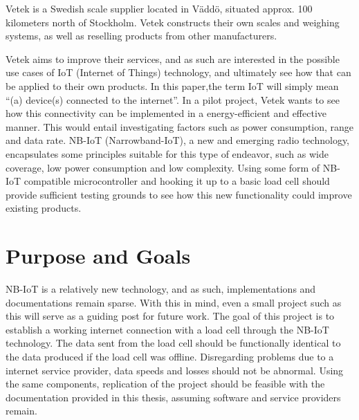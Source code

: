 Vetek is a Swedish scale supplier located in Väddö, situated approx. 100 kilometers north of Stockholm. Vetek constructs their own scales and weighing systems, as well as reselling products from other manufacturers.\cite{vetek} 

Vetek aims to improve their services, and as such are interested in the possible use cases of IoT (Internet of Things) technology, and ultimately see how that can be applied to their own products. In this paper,the term IoT will simply mean ``(a) device(s) connected to the internet''\cite{what_is_iot}. In a pilot project, Vetek wants to see how this connectivity can be implemented in a energy-efficient and effective manner. This would entail investigating factors such as power consumption, range and data rate. NB-IoT (Narrowband-IoT), a new and emerging radio technology, encapsulates some principles suitable for this type of endeavor, such as wide coverage, low power consumption and low complexity.\cite{NB-overview} Using some form of NB-IoT compatible microcontroller and hooking it up to a basic load cell should provide sufficient testing grounds to see how this new functionality could improve existing products.


\section{Purpose and Goals}
\iffalse
\begin{itemize}
	\item Write about the grand scheme of things
	\item Set the correct expectations
	\item What can I expect to learn if I keep on reading?
	\item What are the success criteria for this work?
	\item How will the work be evaluated?
\end{itemize}
\fi

NB-IoT is a relatively new technology, and as such, implementations and documentations remain sparse. With this in mind, even a small project such as this will serve as a guiding post for future work. The goal of this project is to establish a working internet connection with a load cell through the NB-IoT technology. The data sent from the load cell should be functionally identical to the data produced if the load cell was offline. Disregarding problems due to a internet service provider, data speeds and losses should not be abnormal. Using the same components, replication of the project should be feasible with the documentation provided in this thesis, assuming software and service providers remain.

